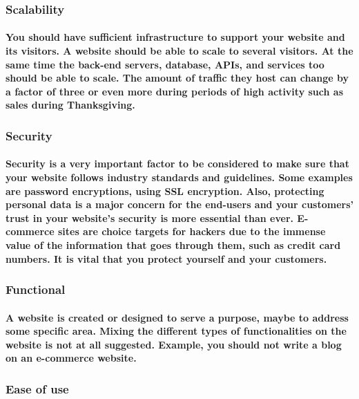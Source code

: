 \documentclass[12pt,a4paper]{article}
\begin{document}
    \subsubsection{Scalability}

    \paragraph{You should have sufficient infrastructure to support your website and its visitors. A website should be able to scale to several visitors. At the same time the back-end servers, database, APIs, and services too should be able to scale. The amount of traffic they host can change by a factor of three or even more during periods of high activity such as sales during Thanksgiving.
    }
    
    \subsubsection{Security}

    \paragraph{Security is a very important factor to be considered to make sure that your website follows industry standards and guidelines. Some examples are password encryptions, using SSL encryption. Also, protecting personal data is a major concern for the end-users and your customers’ trust in your website’s security is more essential than ever. E-commerce sites are choice targets for hackers due to the immense value of the information that goes through them, such as credit card numbers. It is vital that you protect yourself and your customers.
    }
    
    \subsubsection{Functional}

    \paragraph{A website is created or designed to serve a purpose, maybe to address some specific area. Mixing the different types of functionalities on the website is not at all suggested. Example, you should not write a blog on an e-commerce website.
    }
    
    \subsubsection{Ease of use}
\end{document}

